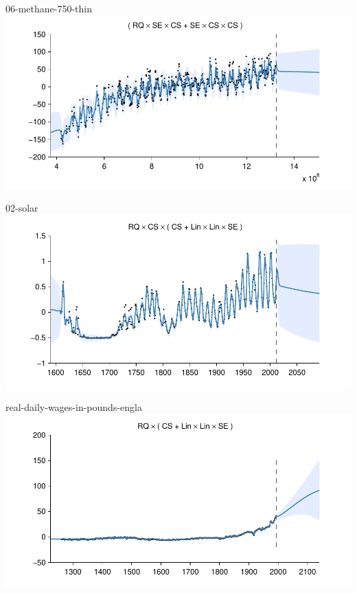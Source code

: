 \begin{frame}{06-methane-750-thin}
  \center
  \includegraphics[width=1.0\textwidth]{figures/06-methane-750-thin/06-methane-750-thin_all}
\end{frame}  
    
\begin{frame}{02-solar}
  \center
  \includegraphics[width=1.0\textwidth]{figures/02-solar/02-solar_all}
\end{frame}  

\begin{frame}{real-daily-wages-in-pounds-engla}
  \center
  \includegraphics[width=1.0\textwidth]{figures/real-daily-wages-in-pounds-engla/real-daily-wages-in-pounds-engla_all}
\end{frame}  
    
